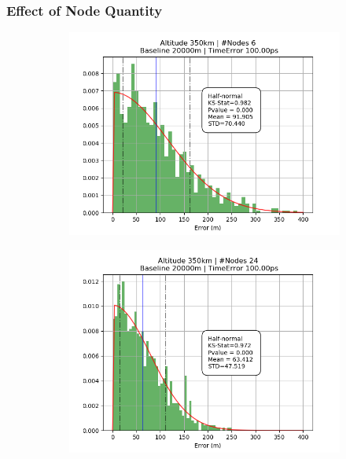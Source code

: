 \documentclass{article}
\begin{document}
\subsubsection{Effect of Node Quantity}
\begin{figure}[H]
  \centering
  \begin{subfigure}[b]{0.49\linewidth}
    \includegraphics[width=\linewidth]{figures/graphs/350_6_20000_100}
  \end{subfigure}
  \begin{subfigure}[b]{0.49\linewidth}
    \includegraphics[width=\linewidth]{figures/graphs/350_24_20000_100}
  \end{subfigure}
\end{figure}
\end{document}
